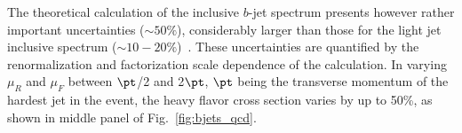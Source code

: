 The theoretical calculation of the inclusive $b$-jet spectrum presents however rather important uncertainties ($\sim 50\%$), considerably larger than those for the light jet inclusive spectrum ($\sim 10-20\%$)~\cite{Frixione:1996nh}. These uncertainties are quantified by the renormalization and factorization scale dependence of the calculation. In varying $\mu_R$ and $\mu_F$ between $\pt$/2 and 2$\pt$, $\pt$ being the transverse momentum of the hardest jet in the event, the heavy flavor cross section varies by up to 50\%, as shown in middle panel of Fig.~\ref{fig:bjets_qcd}. 
